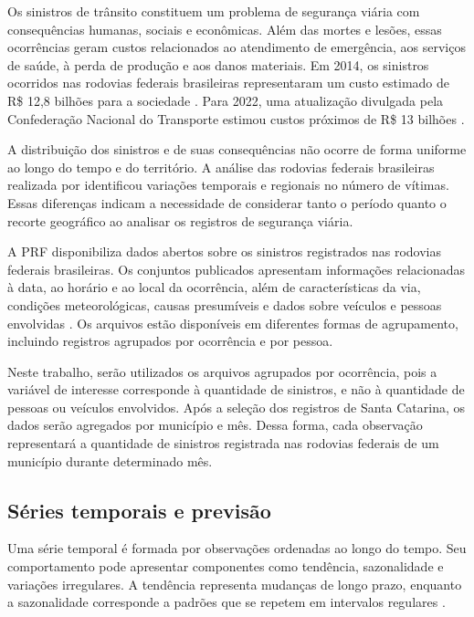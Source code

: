 \documentclass[12pt]{article}
\begin{document}
Os sinistros de trânsito constituem um problema de segurança viária com consequências humanas, sociais e econômicas. Além das mortes e lesões, essas ocorrências geram custos relacionados ao atendimento de emergência, aos serviços de saúde, à perda de produção e aos danos materiais. Em 2014, os sinistros ocorridos nas rodovias federais brasileiras representaram um custo estimado de R\$ 12,8 bilhões para a sociedade \cite{ipea2015acidentes}. Para 2022, uma atualização divulgada pela Confederação Nacional do Transporte estimou custos próximos de R\$ 13 bilhões \cite{cnt2023acidentes}.

A distribuição dos sinistros e de suas consequências não ocorre de forma uniforme ao longo do tempo e do território. A análise das rodovias federais brasileiras realizada por \cite{moraisneto2021tendencia} identificou variações temporais e regionais no número de vítimas. Essas diferenças indicam a necessidade de considerar tanto o período quanto o recorte geográfico ao analisar os registros de segurança viária.

A PRF disponibiliza dados abertos sobre os sinistros registrados nas rodovias federais brasileiras. Os conjuntos publicados apresentam informações relacionadas à data, ao horário e ao local da ocorrência, além de características da via, condições meteorológicas, causas presumíveis e dados sobre veículos e pessoas envolvidas \cite{prf2026dados}. Os arquivos estão disponíveis em diferentes formas de agrupamento, incluindo registros agrupados por ocorrência e por pessoa.

Neste trabalho, serão utilizados os arquivos agrupados por ocorrência, pois a variável de interesse corresponde à quantidade de sinistros, e não à quantidade de pessoas ou veículos envolvidos. Após a seleção dos registros de Santa Catarina, os dados serão agregados por município e mês. Dessa forma, cada observação representará a quantidade de sinistros registrada nas rodovias federais de um município durante determinado mês.

\subsection{Séries temporais e previsão}

Uma série temporal é formada por observações ordenadas ao longo do tempo. Seu comportamento pode apresentar componentes como tendência, sazonalidade e variações irregulares. A tendência representa mudanças de longo prazo, enquanto a sazonalidade corresponde a padrões que se repetem em intervalos regulares \cite{hyndman2021forecasting}.
\end{document}
